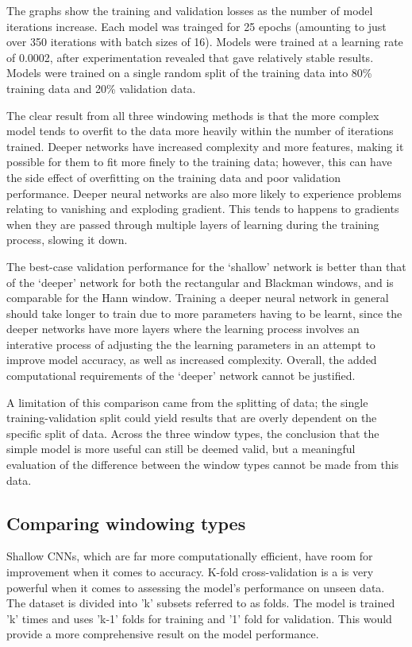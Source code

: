 \documentclass[class=report,11pt,crop=false]{standalone}
\begin{document}
The graphs show the training and validation losses as the number of model iterations increase. Each model was trainged for 25 epochs (amounting to just over 350 iterations with batch sizes of 16). Models were trained at a learning rate of 0.0002, after experimentation revealed that gave relatively stable results. Models were trained on a single random split of the training data into 80\% training data and 20\% validation data.

The clear result from all three windowing methods is that the more complex model tends to overfit to the data more heavily within the number of iterations trained. Deeper networks have increased complexity and more features, making it possible for them to fit more finely to the training data; however, this can have the side effect of overfitting on the training data and poor validation performance. Deeper neural networks are also more likely to experience problems relating to vanishing and exploding gradient. This tends to happens to gradients when they are passed through multiple layers of learning during the training process, slowing it down.

The best-case validation performance for the `shallow' network is better than that of the `deeper' network for both the rectangular and Blackman windows, and is comparable for the Hann window. Training a deeper neural network in general should take longer to train due to more parameters having to be learnt, since the deeper networks have more layers where the learning process involves an interative process of adjusting the the learning parameters in an attempt to improve model accuracy, as well as increased complexity. Overall, the added computational requirements of the `deeper' network cannot be justified.

A limitation of this comparison came from the splitting of data; the single training-validation split could yield results that are overly dependent on the specific split of data. Across the three window types, the conclusion that the simple model is more useful can still be deemed valid, but a meaningful evaluation of the difference between the window types cannot be made from this data.



\subsection{Comparing windowing types}


Shallow CNNs, which are far more computationally efficient, have room for improvement when it comes to accuracy. K-fold cross-validation is a is very powerful when it comes to assessing the model's performance on unseen data. The dataset is divided into 'k' subsets referred to as folds. The model is trained 'k' times and uses 'k-1' folds for training and '1' fold for validation. This would provide a more comprehensive result on the model performance. 
\end{document}
